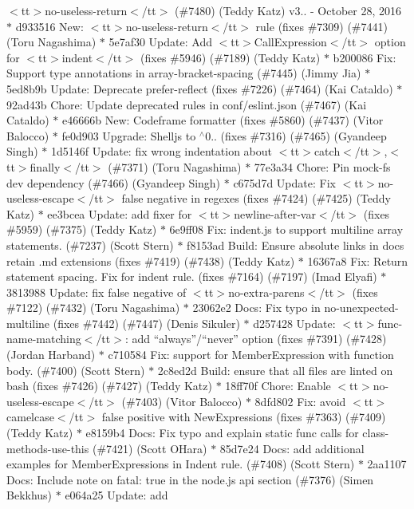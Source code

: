 \begin{DoxyItemize}
$<$tt$>$no-\/useless-\/return$<$/tt$>$ (\#7480) (\+Teddy Katz)  v3.. -\/ October 28, 2016  \texorpdfstring{$\ast$}{*} d933516 New\+: $<$tt$>$no-\/useless-\/return$<$/tt$>$ rule (fixes \#7309) (\#7441) (\+Toru Nagashima) \texorpdfstring{$\ast$}{*} 5e7af30 Update\+: Add $<$tt$>$\+Call\+Expression$<$/tt$>$ option for $<$tt$>$indent$<$/tt$>$ (fixes \#5946) (\#7189) (\+Teddy Katz) \texorpdfstring{$\ast$}{*} b200086 Fix\+: Support type annotations in array-\/bracket-\/spacing (\#7445) (\+Jimmy Jia) \texorpdfstring{$\ast$}{*} 5ed8b9b Update\+: Deprecate prefer-\/reflect (fixes \#7226) (\#7464) (\+Kai Cataldo) \texorpdfstring{$\ast$}{*} 92ad43b Chore\+: Update deprecated rules in conf/eslint.\+json (\#7467) (\+Kai Cataldo) \texorpdfstring{$\ast$}{*} e46666b New\+: Codeframe formatter (fixes \#5860) (\#7437) (\+Vitor Balocco) \texorpdfstring{$\ast$}{*} fe0d903 Upgrade\+: Shelljs to \texorpdfstring{$^\wedge$}{\string^}0.. (fixes \#7316) (\#7465) (\+Gyandeep Singh) \texorpdfstring{$\ast$}{*} 1d5146f Update\+: fix wrong indentation about $<$tt$>$catch$<$/tt$>$,$<$tt$>$finally$<$/tt$>$ (\#7371) (\+Toru Nagashima) \texorpdfstring{$\ast$}{*} 77e3a34 Chore\+: Pin mock-\/fs dev dependency (\#7466) (\+Gyandeep Singh) \texorpdfstring{$\ast$}{*} c675d7d Update\+: Fix $<$tt$>$no-\/useless-\/escape$<$/tt$>$ false negative in regexes (fixes \#7424) (\#7425) (\+Teddy Katz) \texorpdfstring{$\ast$}{*} ee3bcea Update\+: add fixer for $<$tt$>$newline-\/after-\/var$<$/tt$>$ (fixes \#5959) (\#7375) (\+Teddy Katz) \texorpdfstring{$\ast$}{*} 6e9ff08 Fix\+: indent.\+js to support multiline array statements. (\#7237) (\+Scott Stern) \texorpdfstring{$\ast$}{*} f8153ad Build\+: Ensure absolute links in docs retain .\+md extensions (fixes \#7419) (\#7438) (\+Teddy Katz) \texorpdfstring{$\ast$}{*} 16367a8 Fix\+: Return statement spacing. Fix for indent rule. (fixes \#7164) (\#7197) (\+Imad Elyafi) \texorpdfstring{$\ast$}{*} 3813988 Update\+: fix false negative of $<$tt$>$no-\/extra-\/parens$<$/tt$>$ (fixes \#7122) (\#7432) (\+Toru Nagashima) \texorpdfstring{$\ast$}{*} 23062e2 Docs\+: Fix typo in no-\/unexpected-\/multiline (fixes \#7442) (\#7447) (\+Denis Sikuler) \texorpdfstring{$\ast$}{*} d257428 Update\+: $<$tt$>$func-\/name-\/matching$<$/tt$>$\+: add “always”/“never” option (fixes \#7391) (\#7428) (\+Jordan Harband) \texorpdfstring{$\ast$}{*} c710584 Fix\+: support for Member\+Expression with function body. (\#7400) (\+Scott Stern) \texorpdfstring{$\ast$}{*} 2c8ed2d Build\+: ensure that all files are linted on bash (fixes \#7426) (\#7427) (\+Teddy Katz) \texorpdfstring{$\ast$}{*} 18ff70f Chore\+: Enable $<$tt$>$no-\/useless-\/escape$<$/tt$>$ (\#7403) (\+Vitor Balocco) \texorpdfstring{$\ast$}{*} 8dfd802 Fix\+: avoid $<$tt$>$camelcase$<$/tt$>$ false positive with New\+Expressions (fixes \#7363) (\#7409) (\+Teddy Katz) \texorpdfstring{$\ast$}{*} e8159b4 Docs\+: Fix typo and explain static func calls for class-\/methods-\/use-\/this (\#7421) (\+Scott O\textquotesingle{}\+Hara) \texorpdfstring{$\ast$}{*} 85d7e24 Docs\+: add additional examples for Member\+Expressions in Indent rule. (\#7408) (\+Scott Stern) \texorpdfstring{$\ast$}{*} 2aa1107 Docs\+: Include note on fatal\+: true in the node.\+js api section (\#7376) (\+Simen Bekkhus) \texorpdfstring{$\ast$}{*} e064a25 Update\+: add 
\end{DoxyItemize}

